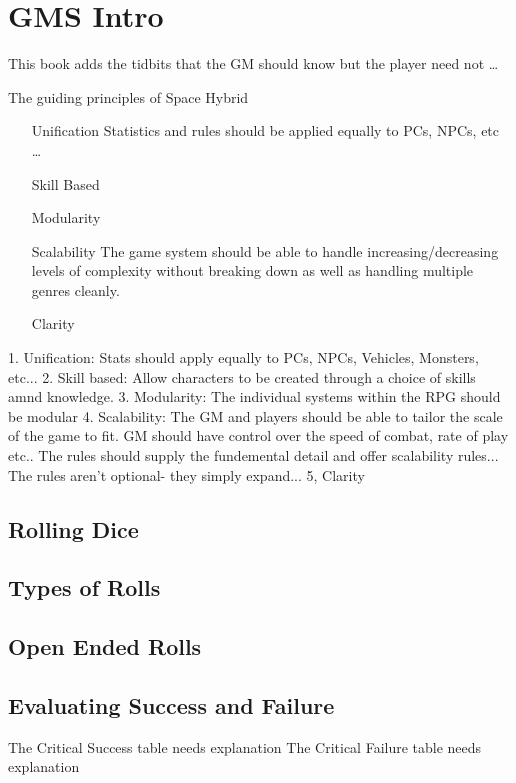 \chapter{GMS Intro}

This book adds the tidbits that the GM should know but the 
player need not \dots

The guiding principles of Space Hybrid\ 

\begin{enumerate}
\item[Unification] Statistics and rules should be applied equally to
PCs, NPCs, etc \dots
\item[Skill Based] 
\item[Modularity]
\item[Scalability] The game system should be able to handle 
increasing/decreasing levels of complexity without breaking down
as well as handling multiple genres cleanly.
\item[Clarity]
\end{enumerate}

1. Unification: Stats should apply equally to PCs, NPCs, Vehicles, Monsters, etc...
2. Skill based: Allow characters to be created through a choice of skills amnd
knowledge.
3. Modularity: The individual systems within the RPG should be modular
4. Scalability: The GM and players should be able to tailor the scale
of the game to fit. GM should have control over the speed of combat,
rate of play etc.. The rules should supply the fundemental detail
and offer scalability rules... The rules aren't optional- they simply
expand...
5, Clarity

\section{Rolling Dice}

\section{Types of Rolls}

\section{Open Ended Rolls}

\section{Evaluating Success and Failure}

The Critical Success table needs explanation
The Critical Failure table needs explanation
